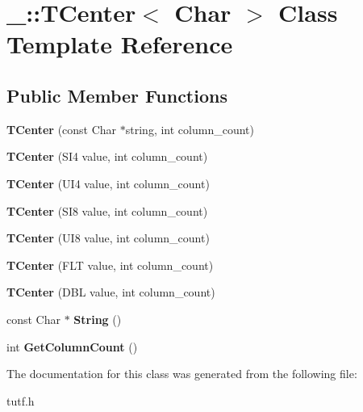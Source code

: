 \hypertarget{class___1_1_t_center}{}\section{\+\_\+\+:\+:T\+Center$<$ Char $>$ Class Template Reference}
\label{class___1_1_t_center}
\subsection*{Public Member Functions}
\begin{DoxyCompactItemize}
\item 
\mbox{\label{class___1_1_t_center_a834ea8bf14a24797ed89c242f92d9b70}} 
{\bfseries T\+Center} (const Char $\ast$string, int column\+\_\+count)
\item 
\mbox{\label{class___1_1_t_center_aa999e05e0a65e6adb98b32b473601274}} 
{\bfseries T\+Center} (S\+I4 value, int column\+\_\+count)
\item 
\mbox{\label{class___1_1_t_center_aee9440c4d00cae71b9e35d057a3e8d90}} 
{\bfseries T\+Center} (U\+I4 value, int column\+\_\+count)
\item 
\mbox{\label{class___1_1_t_center_a5e86b0c5fad0898181ec4f9ab5368a2b}} 
{\bfseries T\+Center} (S\+I8 value, int column\+\_\+count)
\item 
\mbox{\label{class___1_1_t_center_a3de299cbfc6105db6225b6c53d44c5ef}} 
{\bfseries T\+Center} (U\+I8 value, int column\+\_\+count)
\item 
\mbox{\label{class___1_1_t_center_a8bd3de195af875121eb74472e16753ed}} 
{\bfseries T\+Center} (F\+LT value, int column\+\_\+count)
\item 
\mbox{\label{class___1_1_t_center_a88cdfed91f788c665ef08a7950b85c63}} 
{\bfseries T\+Center} (D\+BL value, int column\+\_\+count)
\item 
\mbox{\label{class___1_1_t_center_a8c0d0187c54ac8391e67e2c74fbacc6c}} 
const Char $\ast$ {\bfseries String} ()
\item 
\mbox{\label{class___1_1_t_center_a319e3301ab3c6f1221e20ec9a6220c03}} 
int {\bfseries Get\+Column\+Count} ()
\end{DoxyCompactItemize}


The documentation for this class was generated from the following file\+:\begin{DoxyCompactItemize}
\item 
tutf.\+h\end{DoxyCompactItemize}
